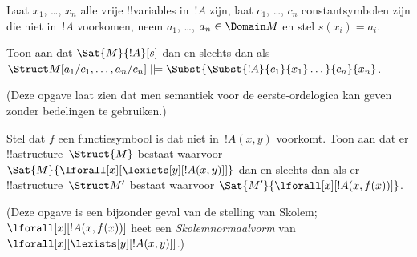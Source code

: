\documentclass[../../../include/open-logic-section]{subfiles}
\begin{document}
\begin{prob}
\begin{enumerate}

\end{enumerate}
Laat $x_1$, \dots, $x_n$ alle vrije !!{variable}s in~$!A$ zijn,
laat $c_1$, \dots, $c_n$ constantsymbolen zijn die niet in~$!A$
voorkomen, neem $a_1$, \dots, $a_n \in \Domain M$ en stel
$s(x_i) = a_i$.

Toon aan dat $\Sat{M}{!A}[s]$ dan en slechts dan als
$\Struct M[a_1/c_1,\dots,a_n/c_n]
\VDash \Subst{\Subst{!A}{c_1}{x_1}\dots}{c_n}{x_n}$.

(Deze opgave laat zien dat men semantiek voor de eerste-ordelogica kan
geven zonder bedelingen te gebruiken.)
\end{prob}

\begin{prob}
Stel dat $f$ een functiesymbool is dat niet in~$!A(x,y)$ voorkomt.
Toon aan dat er !!a{structure}~$\Struct{M}$ bestaat waarvoor
$\Sat{M}{\lforall[x][\lexists[y][!A(x,y)]]}$ dan en slechts dan als er
!!a{structure}~$\Struct M'$ bestaat waarvoor
$\Sat{M'}{\lforall[x][!A(x,f(x))]}$.

(Deze opgave is een bijzonder geval van de stelling van Skolem;
$\lforall[x][!A(x,f(x))]$ heet een \emph{Skolemnormaalvorm} van
$\lforall[x][\lexists[y][!A(x,y)]]$.)
\end{prob}
\end{document}
